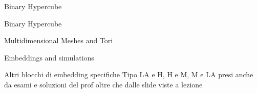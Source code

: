 \documentclass[final]{beamer}
\newlength{\colwidth}
\begin{document}
\begin{frame}[t]
\begin{columns}[t]
\begin{column}{\colwidth}
\begin{block}{Binary Hypercube}
                \end{block}
                \begin{block}{Binary Hypercube}
                    
                \end{block}
                \begin{block}{Multidimensional Meshes and Tori}
                    
                \end{block}
                \begin{block}{Embeddings and simulations}
                    
                \end{block}
                \begin{block}{Altri blocchi di embedding specifiche}
                    Tipo LA e H, H e M, M e LA presi anche da esami e soluzioni del prof oltre che dalle slide viste a lezione
                \end{block}
            \end{column}
        \end{columns}
    \end{frame}
\end{document}
